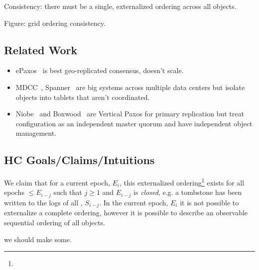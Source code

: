 \documentclass[10pt,twocolumn]{article}
\begin{document}
Consistency: there must be a single, externalized ordering across all
objects.

Figure: grid ordering consistency.  

\subsection*{Related Work}

\begin{itemize}
    \item ePaxos~\cite{epaxos} is best geo-replicated consensus, doesn't
    scale.
    \item MDCC~\cite{mdcc}, Spanner~\cite{spanner} are big systems across
    multiple data centers but isolate objects into tablets that aren't
    coordinated. 
    \item Niobe~\cite{niobe} and Boxwood~\cite{boxwood} are Vertical Paxos
    for primary replication but treat configuration as an independent master
    quorum and have independent object management.
\end{itemize}

\subsection*{HC Goals/Claims/Intuitions}

 We claim that for a current epoch, $E_i$,
this externalized ordering\footnote{} exists
for all epochs $\leq E_{i-j}$ such that $j\geq1$ and $E_{i-j}$ is
\emph{closed}, e.g. a tombstone has been written to the logs of all \subs,
$S_{i-j}$.
In the current epoch, $E_i$ it is not possible to externalize a complete
ordering,  however it is possible to describe an observable sequential
ordering of all objects.

 we should make some.
\end{document}
